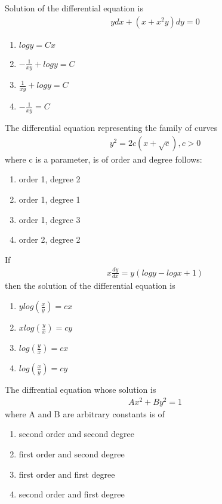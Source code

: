 \item Solution of the differential equation is
\begin{align*}
ydx + (x + x^2y)dy = 0
\end{align*}
\begin{enumerate}
\item $logy = Cx$
\item $-\frac{1}{xy} + log y = C$
\item $\frac{1}{xy} + logy = C$
\item $-\frac{1}{xy} = C$
\end{enumerate}

\item The differential equation representing the family of curves
\begin{align*}
y^2 = 2c(x + \sqrt{c}), c > 0 
\end{align*}
where c is a parameter, is of order and degree follows:
\begin{enumerate}
\item order 1, degree 2
\item order 1, degree 1
\item order 1, degree 3
\item order 2, degree 2
\end{enumerate}

\item If 
\begin{align*}
x\frac{dy}{dx} = y(logy - logx + 1)
\end{align*}
then the solution of the differential equation is
\begin{enumerate}
\item $ylog\left(\frac{x}{y}\right) = cx$
\item $xlog\left(\frac{y}{x}\right) = cy$
\item $log\left(\frac{y}{x}\right) = cx$
\item $log\left(\frac{x}{y}\right) = cy$
\end{enumerate} 

\item The diffrential equation whose solution is
\begin{align}
Ax^2 + By^2 = 1
\end{align}
where A and B are arbitrary constants is of
\begin{enumerate}
\item second order and second degree
\item first order and second degree
\item first order and first degree
\item second order and first degree
\end{enumerate}


